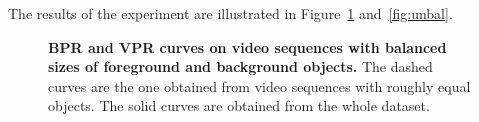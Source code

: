 The results of the experiment are illustrated in Figure~\ref{fig:bal} and~\ref{fig:unbal}.
\begin{figure}[!hb]
\centering
{}
\quad%
\caption[BPR and VPR curves on video sequences with balanced sizes of foreground and background objects]{
{\bf BPR and VPR curves on video sequences with balanced sizes of foreground and background objects.} The dashed curves are the one obtained from video sequences with roughly equal objects.
The solid curves are obtained from the whole dataset.}
\label{fig:bal}
\end{figure}
